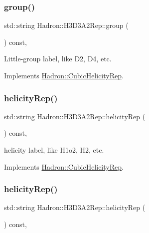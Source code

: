 \subsubsection{\texorpdfstring{group()}{group()}\hspace{0.1cm}{\footnotesize\ttfamily [5/5]}}
{\footnotesize\ttfamily std\+::string Hadron\+::\+H3\+D3\+A2\+Rep\+::group (\begin{DoxyParamCaption}{ }\end{DoxyParamCaption}) const\hspace{0.3cm}{\ttfamily [inline]}, {\ttfamily [virtual]}}

Little-\/group label, like D2, D4, etc. 

Implements \mbox{\hyperlink{structHadron_1_1CubicHelicityRep_a101a7d76cd8ccdad0f272db44b766113}{Hadron\+::\+Cubic\+Helicity\+Rep}}.

\mbox{\label{structHadron_1_1H3D3A2Rep_adb8dca7dffaed3e2601a160205d6d23c}} 
\subsubsection{\texorpdfstring{helicityRep()}{helicityRep()}\hspace{0.1cm}{\footnotesize\ttfamily [1/3]}}
{\footnotesize\ttfamily std\+::string Hadron\+::\+H3\+D3\+A2\+Rep\+::helicity\+Rep (\begin{DoxyParamCaption}{ }\end{DoxyParamCaption}) const\hspace{0.3cm}{\ttfamily [inline]}, {\ttfamily [virtual]}}

helicity label, like H1o2, H2, etc. 

Implements \mbox{\hyperlink{structHadron_1_1CubicHelicityRep_af1096946b7470edf0a55451cc662f231}{Hadron\+::\+Cubic\+Helicity\+Rep}}.

\mbox{\label{structHadron_1_1H3D3A2Rep_adb8dca7dffaed3e2601a160205d6d23c}} 
\subsubsection{\texorpdfstring{helicityRep()}{helicityRep()}\hspace{0.1cm}{\footnotesize\ttfamily [2/3]}}
{\footnotesize\ttfamily std\+::string Hadron\+::\+H3\+D3\+A2\+Rep\+::helicity\+Rep (\begin{DoxyParamCaption}{ }\end{DoxyParamCaption}) const\hspace{0.3cm}{\ttfamily [inline]}, {\ttfamily [virtual]}}

